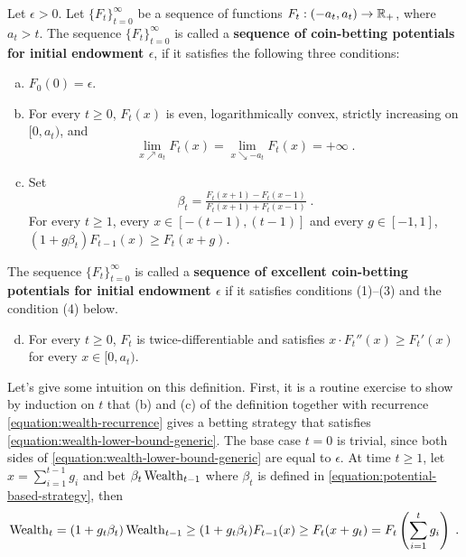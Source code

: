 \begin{definition}
\label{definition:potential}
Let $\epsilon > 0$. Let $\{F_t\}_{t=0}^\infty$ be a sequence of functions
$F_t:(-a_t, a_t)  \to \mathbb{R}_+$, where $a_t > t$.  The sequence
$\{F_t\}_{t=0}^\infty$ is called a \textbf{sequence of coin-betting potentials
for initial endowment $\epsilon$}, if it satisfies the following three
conditions:
\begin{enumerate}[(a)]
\item $F_0(0) = \epsilon$.

\item For every $t \ge 0$, $F_t(x)$ is even, logarithmically convex, strictly
increasing on $[0,a_t)$, and
\begin{equation}
\label{equation:potential-limit-assumption}
\lim_{x \nearrow a_t} F_t(x) = \lim_{x \searrow -a_t} F_t(x) = +\infty \; .
\end{equation}
\item Set 
\begin{equation}
\label{equation:potential-based-strategy}
\beta_t=\tfrac{F_t(x + 1) - F_t(x - 1)}{F_t(x + 1) + F_t(x - 1)} \;.
\end{equation}
For every $t \ge 1$, every $x \in [-(t-1), (t-1)]$ and every $g \in [-1,1]$, $\left(1 + g \beta_t \right) F_{t-1}(x) \ge F_t(x+g)$.
\end{enumerate}
The sequence $\{F_t\}_{t=0}^\infty$ is called a
\textbf{sequence of excellent coin-betting potentials for initial
endowment $\epsilon$} if it satisfies conditions (1)--(3) and the condition (4)
below.
\begin{enumerate}[(a)]
\setcounter{enumi}{3}
\item For every $t \ge 0$, $F_t$ is twice-differentiable and
satisfies $x \cdot F_t''(x) \ge F_t'(x)$ for every $x \in [0,a_t)$.
\end{enumerate}
\end{definition}

Let's give some intuition on this definition.
First, it is a routine exercise to show by induction on $t$ that (b) and (c) of
the definition together with recurrence \eqref{equation:wealth-recurrence} gives a betting strategy that 
satisfies \eqref{equation:wealth-lower-bound-generic}. The base case $t=0$ is trivial,
since both sides of \eqref{equation:wealth-lower-bound-generic} are equal to
$\epsilon$. At time $t \ge 1$, let $x = \sum_{i=1}^{t-1} g_i$ and bet $\beta_t \operatorname{Wealth}_{t-1}$ where $\beta_t$ is defined in \eqref{equation:potential-based-strategy}, then
\vspace{-.2cm}
\[
\operatorname{Wealth}_t
= (1+g_t \beta_t) \operatorname{Wealth}_{t-1}
\ge (1 + g_t \beta_t) F_{t-1}(x)
\ge F_t(x + g_t)
= F_t \left( \sum_{i=1}^t g_i \right) \; .
\]

